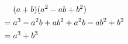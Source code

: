 \begin{align*}
&\mathrel{\phantom{=}}
   (a+b)(a^2-ab+b^2) \notag \\
&= a^3 - a^2b + ab^2 + a^2b
   - ab^2 + b^2 \notag \\
&= a^3 + b^3 \label{eq:cubesum}
\end{align*}
